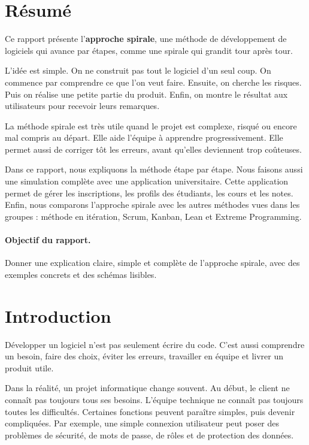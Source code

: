\documentclass[12pt,a4paper]{article}
\newcommand{\important}[1]{\textbf{#1}}
\begin{document}
\tableofcontents
\newpage

\section*{Résumé}

Ce rapport présente l'\important{approche spirale}, une méthode de développement de logiciels qui avance par étapes, comme une spirale qui grandit tour après tour.

L'idée est simple. On ne construit pas tout le logiciel d'un seul coup. On commence par comprendre ce que l'on veut faire. Ensuite, on cherche les risques. Puis on réalise une petite partie du produit. Enfin, on montre le résultat aux utilisateurs pour recevoir leurs remarques.

La méthode spirale est très utile quand le projet est complexe, risqué ou encore mal compris au départ. Elle aide l'équipe à apprendre progressivement. Elle permet aussi de corriger tôt les erreurs, avant qu'elles deviennent trop coûteuses.

Dans ce rapport, nous expliquons la méthode étape par étape. Nous faisons aussi une simulation complète avec une application universitaire. Cette application permet de gérer les inscriptions, les profils des étudiants, les cours et les notes. Enfin, nous comparons l'approche spirale avec les autres méthodes vues dans les groupes : méthode en itération, Scrum, Kanban, Lean et Extreme Programming.

\paragraph{Objectif du rapport.}
Donner une explication claire, simple et complète de l'approche spirale, avec des exemples concrets et des schémas lisibles.

\newpage

\section{Introduction}

Développer un logiciel n'est pas seulement écrire du code. C'est aussi comprendre un besoin, faire des choix, éviter les erreurs, travailler en équipe et livrer un produit utile.

Dans la réalité, un projet informatique change souvent. Au début, le client ne connaît pas toujours tous ses besoins. L'équipe technique ne connaît pas toujours toutes les difficultés. Certaines fonctions peuvent paraître simples, puis devenir compliquées. Par exemple, une simple connexion utilisateur peut poser des problèmes de sécurité, de mots de passe, de rôles et de protection des données.
\end{document}
